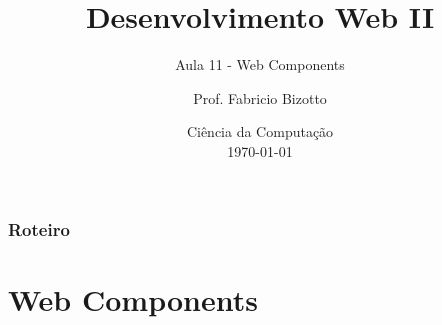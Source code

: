 \documentclass[
	9pt, %
	t, %
]{beamer}
\title[DesWebII]{Desenvolvimento Web II} %
\subtitle{Aula 11 - Web Components} %
\author[Fabricio Bizotto]{Prof. Fabricio Bizotto} %
\institute[IFC]{Instituto Federal Catarinense \\ \smallskip \textit{fabricio.bizotto@ifc.edu.br}} %
\date[\today]{Ciência da Computação \\ \today} %
\begin{document}

\begin{frame}
	\titlepage %
\end{frame}


\begin{frame}
	\frametitle{Roteiro} %
	
	\tableofcontents %
\end{frame}


\section{Web Components}
\end{document}
